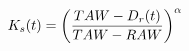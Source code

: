 \documentclass[preview]{standalone}
\begin{document}
\begin{align*}
\special{dvisvgm:raw <g id='unique000'>}K_s(t) = \left(\frac{TAW - D_r(t)}{TAW - RAW}\right)^{\alpha}\special{dvisvgm:raw </g>}
\end{align*}
\end{document}

